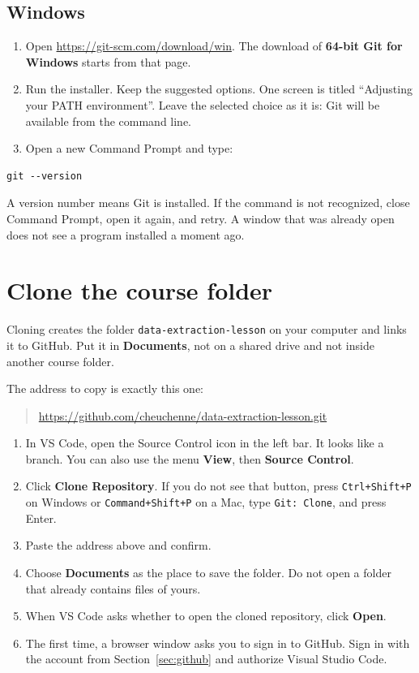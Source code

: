 \documentclass[11pt,a4paper]{article}
\newcommand{\menu}[1]{\textbf{#1}}
\newcommand{\file}[1]{\texttt{#1}}
\newcommand{\cmd}[1]{\texttt{#1}}
\begin{document}
\subsection{Windows}

\begin{enumerate}
\item Open \url{https://git-scm.com/download/win}. The download of \textbf{64-bit Git for Windows} starts from that page.
\item Run the installer. Keep the suggested options. One screen is titled ``Adjusting your PATH environment''. Leave the selected choice as it is: Git will be available from the command line.
\item Open a new Command Prompt and type:
\end{enumerate}

\begin{verbatim}
git --version
\end{verbatim}

A version number means Git is installed. If the command is not recognized, close Command Prompt, open it again, and retry. A window that was already open does not see a program installed a moment ago.

\section{Clone the course folder}
\label{sec:clone}

Cloning creates the folder \file{data-extraction-lesson} on your computer and links it to GitHub. Put it in \menu{Documents}, not on a shared drive and not inside another course folder.

The address to copy is exactly this one:

\begin{quote}
\url{https://github.com/cheuchenne/data-extraction-lesson.git}
\end{quote}

\begin{enumerate}
\item In VS Code, open the Source Control icon in the left bar. It looks like a branch. You can also use the menu \menu{View}, then \menu{Source Control}.
\item Click \menu{Clone Repository}. If you do not see that button, press \cmd{Ctrl+Shift+P} on Windows or \cmd{Command+Shift+P} on a Mac, type \cmd{Git: Clone}, and press Enter.
\item Paste the address above and confirm.
\item Choose \menu{Documents} as the place to save the folder. Do not open a folder that already contains files of yours.
\item When VS Code asks whether to open the cloned repository, click \menu{Open}.
\item The first time, a browser window asks you to sign in to GitHub. Sign in with the account from Section~\ref{sec:github} and authorize Visual Studio Code.
\end{enumerate}
\end{document}
